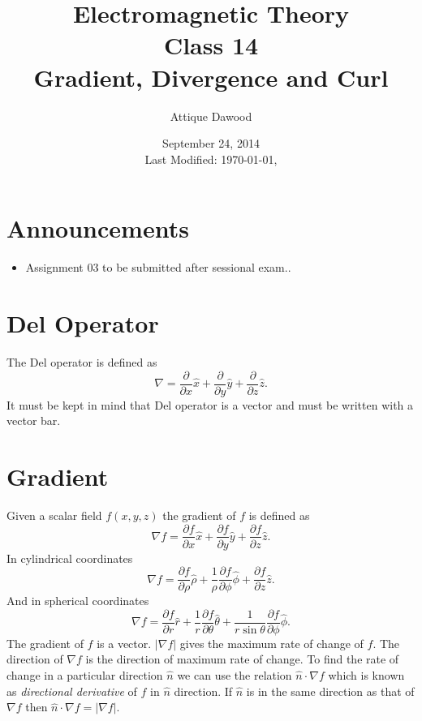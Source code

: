 \documentclass[12pt,a4paper]{article}
\title{Electromagnetic Theory\\Class 14\\Gradient, Divergence and Curl}
\author{Attique Dawood}
\date{September 24, 2014\\[0.2cm] Last Modified: \today, \currenttime}
\begin{document}
\maketitle
\section{Announcements}
\begin{itemize}
\item Assignment 03 to be submitted after sessional exam..
\end{itemize}
\section{Del Operator}
The Del operator is defined as
\begin{equation}
\nabla=\dfrac{\partial}{\partial x}\hat x+\dfrac{\partial}{\partial y}\hat y+\dfrac{\partial}{\partial z}\hat z.
\end{equation}
It must be kept in mind that Del operator is a vector and must be written with a vector bar.
\section{Gradient}
Given a scalar field $f(x,y,z)$ the gradient of $f$ is defined as
\begin{equation}
\nabla f=\dfrac{\partial f}{\partial x}\hat x+\dfrac{\partial f}{\partial y}\hat y+\dfrac{\partial f}{\partial z}\hat z.
\end{equation}
In cylindrical coordinates
\begin{equation}
\nabla f=\dfrac{\partial f}{\partial\rho}\hat\rho+\dfrac{1}{\rho}\dfrac{\partial f}{\partial\phi}\hat\phi+\dfrac{\partial f}{\partial z}\hat z.
\end{equation}
And in spherical coordinates
\begin{equation}
\nabla f=\dfrac{\partial f}{\partial r}\hat r+\dfrac{1}{r}\dfrac{\partial f}{\partial\theta}\hat\theta+\dfrac{1}{r\sin\theta}\dfrac{\partial f}{\partial\phi}\hat\phi.
\end{equation}
The gradient of $f$ is a vector. $|\nabla f|$ gives the maximum rate of change of $f$. The direction of $\nabla f$ is the direction of maximum rate of change. To find the rate of change in a particular direction $\hat n$ we can use the relation $\hat n\cdot\nabla f$ which is known as \textit{directional derivative} of $f$ in $\hat n$ direction. If $\hat n$ is in the same direction as that of $\nabla f$ then $\hat n\cdot\nabla f=|\nabla f|$.
\end{document}
